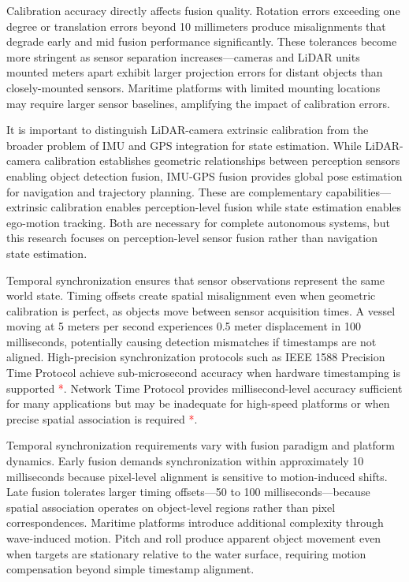 \documentclass[../main.tex]{subfiles}
\begin{document}
Calibration accuracy directly affects fusion quality. Rotation errors exceeding one degree or translation errors beyond 10 millimeters produce misalignments that degrade early and mid fusion performance significantly. These tolerances become more stringent as sensor separation increases—cameras and LiDAR units mounted meters apart exhibit larger projection errors for distant objects than closely-mounted sensors. Maritime platforms with limited mounting locations may require larger sensor baselines, amplifying the impact of calibration errors.

It is important to distinguish LiDAR-camera extrinsic calibration from the broader problem of IMU and GPS integration for state estimation. While LiDAR-camera calibration establishes geometric relationships between perception sensors enabling object detection fusion, IMU-GPS fusion provides global pose estimation for navigation and trajectory planning. These are complementary capabilities—extrinsic calibration enables perception-level fusion while state estimation enables ego-motion tracking. Both are necessary for complete autonomous systems, but this research focuses on perception-level sensor fusion rather than navigation state estimation.

Temporal synchronization ensures that sensor observations represent the same world state. Timing offsets create spatial misalignment even when geometric calibration is perfect, as objects move between sensor acquisition times. A vessel moving at 5 meters per second experiences 0.5 meter displacement in 100 milliseconds, potentially causing detection mismatches if timestamps are not aligned. High-precision synchronization protocols such as IEEE 1588 Precision Time Protocol achieve sub-microsecond accuracy when hardware timestamping is supported \textcolor{red}{*}. Network Time Protocol provides millisecond-level accuracy sufficient for many applications but may be inadequate for high-speed platforms or when precise spatial association is required \textcolor{red}{*}.

Temporal synchronization requirements vary with fusion paradigm and platform dynamics. Early fusion demands synchronization within approximately 10 milliseconds because pixel-level alignment is sensitive to motion-induced shifts. Late fusion tolerates larger timing offsets—50 to 100 milliseconds—because spatial association operates on object-level regions rather than pixel correspondences. Maritime platforms introduce additional complexity through wave-induced motion. Pitch and roll produce apparent object movement even when targets are stationary relative to the water surface, requiring motion compensation beyond simple timestamp alignment.
\end{document}
